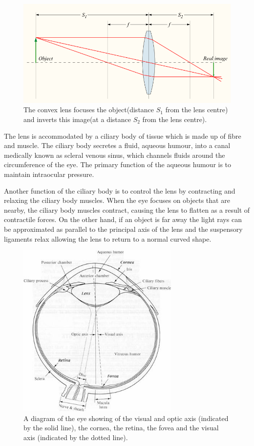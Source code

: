 \begin{figure}[H]
\centering
  \includegraphics{figures/convergent_lens2}
\caption{The convex lens focuses the object(distance $S_1$ from the lens centre)
         and inverts this image(at a distance $S_2$ from the lens centre).
         \cite{greivenkamp2004field}}
\label{fig:convergent_lens}
\end{figure}

The lens is accommodated by a ciliary body of tissue which is made up of fibre and
muscle. The ciliary body secretes a fluid, aqueous humour,  into a canal medically
known as scleral venous sinus, which channels fluids around the circumference of the
eye.\cite{bill1970effects,dvorak1934schlemm} The primary function of the aqueous
humour is to maintain intraocular pressure.

Another function of the ciliary body is to control the lens by contracting and relaxing the
ciliary body muscles. When the eye focuses on objects that are nearby, the ciliary body
muscles contract, causing the lens to flatten as a result of contractile forces. On the
other hand, if an  object is far away the light rays can be approximated as parallel to the
principal axis of the lens and the suspensory ligaments relax allowing the lens to return
to a normal curved shape.

\begin{figure}[H]
\centering
  \includegraphics[width=8cm]{figures/eye_diagram}
\caption{A diagram of the eye showing of the visual
 	     and optic axis (indicated by the solid line), the \gls{cornea}, the retina, the fovea
              and the visual axis (indicated by the dotted line).}
\label{fig:optic_axis}
\end{figure}

